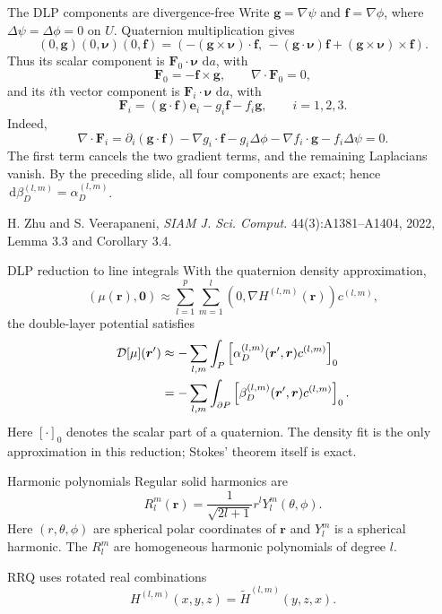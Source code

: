 \documentclass[aspectratio=169,11pt]{beamer}
\newcommand{\dd}{\,\mathrm d}
\newcommand{\rvec}{\bm{r}}
\newcommand{\rp}{\bm{r}'}
\newcommand{\nuvec}{\bm{\nu}}
\begin{document}
\begin{frame}{The DLP components are divergence-free}
\small
Write $\bm g=\nabla\psi$ and $\bm f=\nabla\phi$, where
$\Delta\psi=\Delta\phi=0$ on $U$. Quaternion multiplication gives
\[
  (0,\bm g)(0,\nuvec)(0,\bm f)
  =\left(-\left(\bm g\times\nuvec\right)\cdot\bm f,\,
  -\left(\bm g\cdot\nuvec\right)\bm f
  +\left(\bm g\times\nuvec\right)\times\bm f\right).
\]
Thus its scalar component is $\bm F_0\cdot\nuvec\,\dd a$, with
\[
  \bm F_0=-\bm f\times\bm g,
  \qquad \nabla\cdot\bm F_0=0,
\]
and its $i$th vector component is $\bm F_i\cdot\nuvec\,\dd a$, with
\[
  \bm F_i=(\bm g\cdot\bm f)\mathbf e_i-g_i\bm f-f_i\bm g,
  \qquad i=1,2,3.
\]
Indeed,
\[
  \nabla\cdot\bm F_i
  =\partial_i(\bm g\cdot\bm f)-\nabla g_i\cdot\bm f-g_i\Delta\phi
   -\nabla f_i\cdot\bm g-f_i\Delta\psi=0.
\]
The first term cancels the two gradient terms, and the remaining Laplacians
vanish. By the preceding slide, all four components are exact; hence
$\dd\beta_D^{(l,m)}=\alpha_D^{(l,m)}$.

\footnotesize H. Zhu and S. Veerapaneni, \emph{SIAM J. Sci. Comput.} 44(3):A1381--A1404, 2022, Lemma 3.3 and Corollary 3.4.
\end{frame}

\begin{frame}{DLP reduction to line integrals}
\small
With the quaternion density approximation,
\[
  (\mu(\rvec),\bm0)
  \approx\sum_{l=1}^p\sum_{m=1}^l
  (0,\nabla H^{(l,m)}(\rvec))c^{(l,m)},
\]
the double-layer potential satisfies
\[
\begin{aligned}
  \Dop[\mu](\rp)
  &\approx-\sum_{l,m}\int_P
    \left[\alpha_D^{(l,m)}(\rp,\rvec)c^{(l,m)}\right]_0\\
  &=-\sum_{l,m}\int_{\partial P}
    \left[\beta_D^{(l,m)}(\rp,\rvec)c^{(l,m)}\right]_0.
\end{aligned}
\]
Here $[\cdot]_0$ denotes the scalar part of a quaternion.  The density fit is
the only approximation in this reduction; Stokes' theorem itself is exact.
\end{frame}

\begin{frame}{Harmonic polynomials}
\small
Regular solid harmonics are
\[
  R_l^m(\rvec)
  =
  \frac{1}{\sqrt{2l+1}}r^lY_l^m(\theta,\phi).
\]
Here $(r,\theta,\phi)$ are spherical polar coordinates of $\rvec$ and
$Y_l^m$ is a spherical harmonic.  The $R_l^m$ are homogeneous harmonic
polynomials of degree $l$.

RRQ uses rotated real combinations
\[
  H^{(l,m)}(x,y,z)=\widetilde H^{(l,m)}(y,z,x).
\]

\end{frame}
\end{document}
